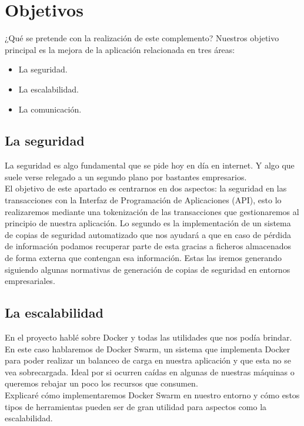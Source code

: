 \section{Objetivos}
¿Qué se pretende con la realización de este complemento? Nuestros objetivo principal es la mejora de la aplicación relacionada en tres áreas:
\begin{itemize}
    \item La seguridad.
    \item La escalabilidad.
    \item La comunicación.
\end{itemize}
\subsection{La seguridad}
La seguridad es algo fundamental que se pide hoy en día en internet. Y algo que suele verse relegado a un segundo plano por bastantes empresarios.
\\El objetivo de este apartado es centrarnos en dos aspectos: la seguridad en las transacciones con la Interfaz de Programación de Aplicaciones (API), esto lo realizaremos mediante una tokenización de las transacciones que gestionaremos al principio de nuestra aplicación. Lo segundo es la implementación de un sistema de copias de seguridad automatizado que nos ayudará a que en caso de pérdida de información podamos recuperar parte de esta gracias a ficheros almacenados de forma externa que contengan esa información. Estas las iremos generando siguiendo algunas normativas de generación de copias de seguridad en entornos empresariales.

\subsection{La escalabilidad}
En el proyecto hablé sobre Docker y todas las utilidades que nos podía brindar. En este caso hablaremos de Docker Swarm, un sistema que implementa Docker para poder realizar un balanceo de carga en nuestra aplicación y que esta no se vea sobrecargada. Ideal por si ocurren caídas en algunas de nuestras máquinas o queremos rebajar un poco los recursos que consumen.
\\Explicaré cómo implementaremos Docker Swarm en nuestro entorno y cómo estos tipos de herramientas pueden ser de gran utilidad para aspectos como la escalabilidad.

